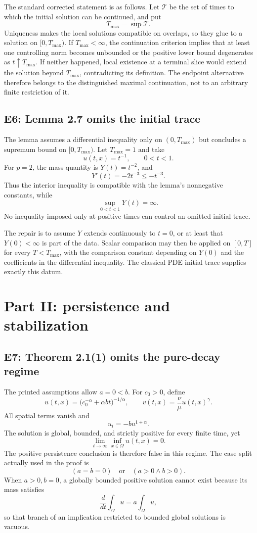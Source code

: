 \documentclass[11pt]{article}
\newcommand{\Om}{\Omega}
\newcommand{\Tmax}{T_{\max}}
\begin{document}
The standard corrected statement is as follows.  Let \(\mathcal T\) be the
set of times to which the initial solution can be continued, and put
\[
 T_{\max}=\sup\mathcal T.
\]
Uniqueness makes the local solutions compatible on overlaps, so they glue to
a solution on \([0,T_{\max})\).  If \(T_{\max}<\infty\), the continuation
criterion implies that at least one controlling norm becomes unbounded or
the positive lower bound degenerates as \(t\uparrow T_{\max}\).  If neither
happened, local existence at a terminal slice would extend the solution
beyond \(T_{\max}\), contradicting its definition.  The endpoint alternative
therefore belongs to the distinguished maximal continuation, not to an
arbitrary finite restriction of it.

\subsection{E6: Lemma 2.7 omits the initial trace}

The lemma assumes a differential inequality only on \((0,\Tmax)\) but
concludes a supremum bound on \([0,\Tmax)\).  Let \(\Tmax=1\) and take
\[
 u(t,x)=t^{-1},\qquad 0<t<1.
\]
For \(p=2\), the mass quantity is \(Y(t)=t^{-2}\), and
\[
 Y'(t)=-2t^{-3}\le-t^{-3}.
\]
Thus the interior inequality is compatible with the lemma's nonnegative
constants, while
\[
 \sup_{0<t<1}Y(t)=\infty.
\]
No inequality imposed only at positive times can control an omitted initial
trace.

The repair is to assume \(Y\) extends continuously to \(t=0\), or at least
that \(Y(0)<\infty\) is part of the data.  Scalar comparison may then be
applied on \([0,T]\) for every \(T<\Tmax\), with the comparison constant
depending on \(Y(0)\) and the coefficients in the differential inequality.
The classical PDE initial trace supplies exactly this datum.

\section{Part II: persistence and stabilization}

\subsection{E7: Theorem 2.1(1) omits the pure-decay regime}

The printed assumptions allow \(a=0<b\).  For \(c_0>0\), define
\[
 u(t,x)=\bigl(c_0^{-\alpha}+\alpha bt\bigr)^{-1/\alpha},
 \qquad
 v(t,x)=\frac{\nu}{\mu}u(t,x)^\gamma.
\]
All spatial terms vanish and
\[
 u_t=-bu^{1+\alpha}.
\]
The solution is global, bounded, and strictly positive for every finite
time, yet
\[
 \lim_{t\to\infty}\inf_{x\in\Om}u(t,x)=0.
\]
The positive persistence conclusion is therefore false in this regime.  The
case split actually used in the proof is
\[
 (a=b=0)\quad\text{or}\quad(a>0\land b>0).
\]
When \(a>0,b=0\), a globally bounded positive solution cannot exist because
its mass satisfies
\[
 \frac{d}{dt}\int_\Om u=a\int_\Om u,
\]
so that branch of an implication restricted to bounded global solutions is
vacuous.
\end{document}
